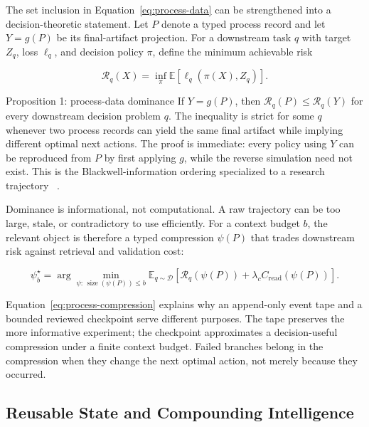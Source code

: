 The set inclusion in Equation~\ref{eq:process-data} can be strengthened into a
decision-theoretic statement. Let $P$ denote a typed process record and let
$Y=g(P)$ be its final-artifact projection. For a downstream task $q$ with target
$Z_q$, loss $\ell_q$, and decision policy $\pi$, define the minimum achievable risk

\begin{equation}
  \mathcal{R}_q(X)
  =\inf_{\pi}\mathbb{E}\!\left[\ell_q\!\left(\pi(X),Z_q\right)\right].
  \label{eq:downstream-risk}
\end{equation}

\begin{paperbox}{Proposition 1: process-data dominance}
If $Y=g(P)$, then $\mathcal{R}_q(P)\leq\mathcal{R}_q(Y)$ for every downstream
decision problem $q$. The inequality is strict for some $q$ whenever two process
records can yield the same final artifact while implying different optimal next
actions. The proof is immediate: every policy using $Y$ can be reproduced from
$P$ by first applying $g$, while the reverse simulation need not exist. This is the
Blackwell-information ordering specialized to a research trajectory
~\citep{blackwell1953equivalent}.
\end{paperbox}

Dominance is informational, not computational. A raw trajectory can be too large,
stale, or contradictory to use efficiently. For a context budget $b$, the relevant
object is therefore a typed compression $\psi(P)$ that trades downstream risk
against retrieval and validation cost:

\begin{equation}
  \psi_b^\star
  =\arg\min_{\psi:\,\operatorname{size}(\psi(P))\leq b}
  \mathbb{E}_{q\sim\mathcal{D}}
  \left[\mathcal{R}_q(\psi(P))+\lambda_c C_{\mathrm{read}}(\psi(P))\right].
  \label{eq:process-compression}
\end{equation}

Equation~\ref{eq:process-compression} explains why an append-only event tape and a
bounded reviewed checkpoint serve different purposes. The tape preserves the more
informative experiment; the checkpoint approximates a decision-useful compression
under a finite context budget. Failed branches belong in the compression when they
change the next optimal action, not merely because they occurred.

\subsection{Reusable State and Compounding Intelligence}

